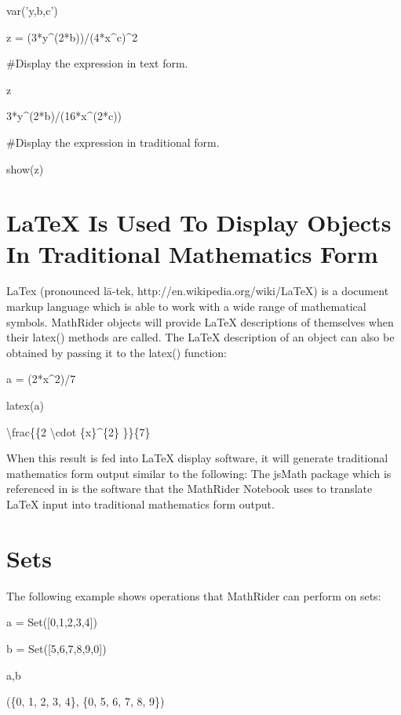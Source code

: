 \documentclass[12pt,oneside]{book}
\begin{document}
var('y,b,c')

z = (3*y\^{}(2*b))/(4*x\^{}c)\^{}2


\#Display the expression in text form.

z

{\textbar}

3*y\^{}(2*b)/(16*x\^{}(2*c))

\#Display the expression in traditional form.

show(z)

{\textbar}


 


\section[LaTeX Is Used To Display Objects In Traditional Mathematics Form]{LaTeX Is Used To Display Objects In Traditional Mathematics Form}

LaTex (pronounced l\=a{}-tek, http://en.wikipedia.org/wiki/LaTeX) is a document markup language which is able to work with a wide range of mathematical symbols. MathRider objects will provide LaTeX descriptions of themselves when their latex() methods are called. The LaTeX description of an object can also be obtained by passing it to the latex() function: 

a = (2*x\^{}2)/7

latex(a)

{\textbar}

{\textbackslash}frac\{\{2 {\textbackslash}cdot \{x\}\^{}\{2\} \}\}\{7\}

When this result is fed into LaTeX display software, it will generate traditional mathematics form output similar to the following: 
The jsMath package which is referenced in is the software that the MathRider Notebook uses to translate LaTeX input into traditional mathematics form output. 

\section[Sets]{Sets}

The following example shows operations that MathRider can perform on sets:


a = Set([0,1,2,3,4])

b = Set([5,6,7,8,9,0])

a,b

{\textbar}

(\{0, 1, 2, 3, 4\}, \{0, 5, 6, 7, 8, 9\})
\end{document}

